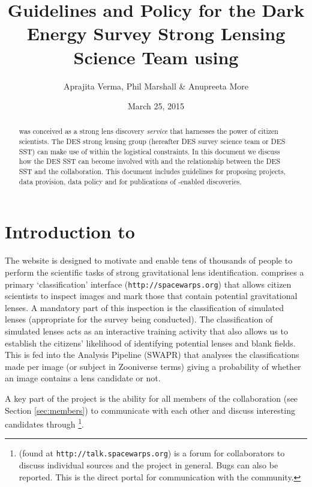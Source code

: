 \documentclass[a4paper,twocolumn]{article}
\begin{document}
             
\title{Guidelines and Policy for the Dark Energy Survey Strong Lensing Science Team using \SW}
\author{Aprajita Verma, Phil Marshall \& Anupreeta More}
\date{March 25, 2015}
\maketitle


\begin{abstract} 
\noindent \SW was conceived as a strong lens
discovery {\it service} that harnesses the power of citizen scientists. The DES strong lensing group (hereafter DES survey science team or DES SST) can make use of \SW within the logistical constraints. In this document we discuss how the DES SST can become involved with \SW and the relationship
between the DES SST and the \SW collaboration. 
This document includes guidelines for proposing projects, data provision, data policy and for publications of \SW-enabled discoveries.
\end{abstract}

\setcounter{footnote}{0}


\section{Introduction to \sw}

The \SW website is designed to motivate and  enable tens of thousands of
people to perform the scientific tasks of strong gravitational lens
identification.  \SW comprises a primary `classification' interface (\texttt{http://spacewarps.org}) that allows citizen scientists to inspect images and mark those that contain potential gravitational lenses. A mandatory part of this inspection is the classification of simulated lenses (appropriate for the survey being conducted). The classification of simulated lenses acts as an interactive training activity that also allows us to establish the citizens' likelihood of identifying potential lenses and blank fields. This is fed into the \SW Analysis Pipeline (SWAPR) that analyses the classifications made per image (or subject in Zooniverse terms) giving a probability of whether an image contains a lens candidate or not.

A key part of the \SW project is the ability for all members of the \SW collaboration (see Section \ref{sec:members}) to communicate with each other and discuss interesting candidates through \Talk\footnote{\Talk (found at \texttt{http://talk.spacewarps.org}) is a forum for \SW collaborators to discuss individual sources and the \SW project in general. Bugs can also be reported. This is the direct portal for communication with the \SW community.}.
\end{document}
